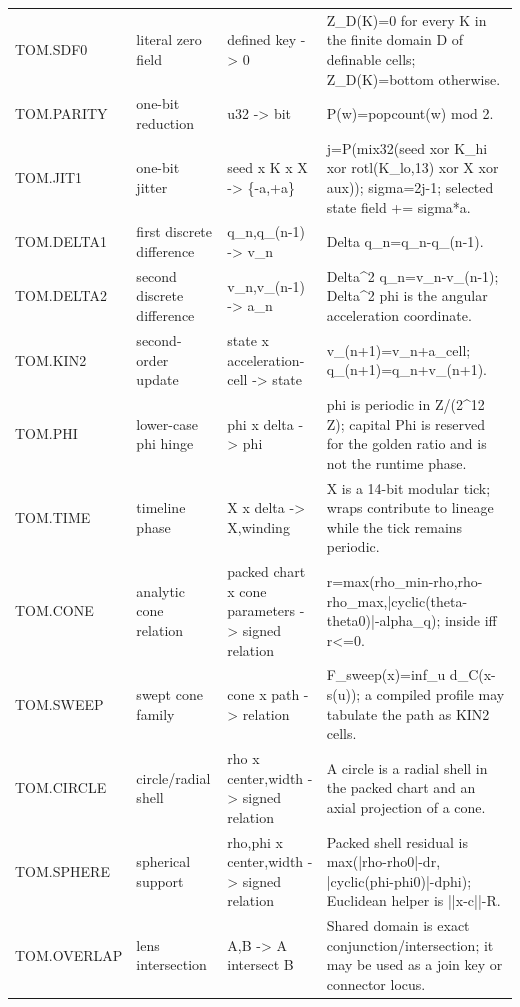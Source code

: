 \begin{longtable}{@{}L{0.18\textwidth}L{0.17\textwidth}L{0.20\textwidth}L{0.39\textwidth}@{}}
TOM.SDF0 & literal zero field & defined key -> 0 & Z\_D(K)=0 for every K in the finite domain D of definable cells;\allowbreak{} Z\_D(K)=bottom otherwise. \\
TOM.PARITY & one-bit reduction & u32 -> bit & P(w)=popcount(w) mod 2. \\
TOM.JIT1 & one-bit jitter & seed x K x X -> \{-a,\allowbreak{}+a\} & j=P(mix32(seed xor K\_hi xor rotl(K\_lo,\allowbreak{}13) xor X xor aux));\allowbreak{} sigma=2j-1;\allowbreak{} selected state field += sigma*a. \\
TOM.DELTA1 & first discrete difference & q\_n,\allowbreak{}q\_(n-1) -> v\_n & Delta q\_n=q\_n-q\_(n-1). \\
TOM.DELTA2 & second discrete difference & v\_n,\allowbreak{}v\_(n-1) -> a\_n & Delta\textasciicircum{}2 q\_n=v\_n-v\_(n-1);\allowbreak{} Delta\textasciicircum{}2 phi is the angular acceleration coordinate. \\
TOM.KIN2 & second-order update & state x acceleration-cell -> state & v\_(n+1)=v\_n+a\_cell;\allowbreak{} q\_(n+1)=q\_n+v\_(n+1). \\
TOM.PHI & lower-case phi hinge & phi x delta -> phi & phi is periodic in Z/\allowbreak{}(2\textasciicircum{}12 Z);\allowbreak{} capital Phi is reserved for the golden ratio and is not the runtime phase. \\
TOM.TIME & timeline phase & X x delta -> X,\allowbreak{}winding & X is a 14-bit modular tick;\allowbreak{} wraps contribute to lineage while the tick remains periodic. \\
TOM.CONE & analytic cone relation & packed chart x cone parameters -> signed relation & r=max(rho\_min-rho,\allowbreak{}rho-rho\_max,\allowbreak{}|cyclic(theta-theta0)|-alpha\_q);\allowbreak{} inside iff r<=0. \\
TOM.SWEEP & swept cone family & cone x path -> relation & F\_sweep(x)=inf\_u d\_C(x-s(u));\allowbreak{} a compiled profile may tabulate the path as KIN2 cells. \\
TOM.CIRCLE & circle/\allowbreak{}radial shell & rho x center,\allowbreak{}width -> signed relation & A circle is a radial shell in the packed chart and an axial projection of a cone. \\
TOM.SPHERE & spherical support & rho,\allowbreak{}phi x center,\allowbreak{}width -> signed relation & Packed shell residual is max(|rho-rho0|-dr,\allowbreak{} |cyclic(phi-phi0)|-dphi);\allowbreak{} Euclidean helper is ||x-c||-R. \\
TOM.OVERLAP & lens intersection & A,\allowbreak{}B -> A intersect B & Shared domain is exact conjunction/\allowbreak{}intersection;\allowbreak{} it may be used as a join key or connector locus. \\

\end{longtable}
